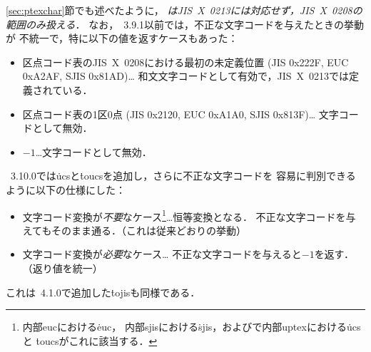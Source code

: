 \documentclass[a4paper,11pt,nomag,dvipdfmx]{jsarticle}
\begin{document}
\begin{dangerous}
  \ref{sec:ptexchar}節でも述べたように，
  \emph{\pTeX はJIS~X~0213には対応せず，JIS~X~0208の範囲のみ扱える}．
  なお，\pTeX~3.9.1以前では，不正な文字コードを与えたときの挙動が
  不統一で，特に以下の値を返すケースもあった：
  \begin{itemize}
    \item 区点コード表のJIS~X~0208における最初の未定義位置
          (JIS 0x222F, EUC 0xA2AF, SJIS 0x81AD)…
          和文文字コードとして有効で，JIS~X~0213では定義されている．
    \item 区点コード表の1区0点
          (JIS 0x2120, EUC 0xA1A0, SJIS 0x813F)…
          文字コードとして無効．
    \item $-1$…文字コードとして無効．
  \end{itemize}
  \pTeX~3.10.0では\.{ucs}と\.{toucs}を追加し，さらに不正な文字コードを
  容易に判別できるように以下の仕様にした：
  \begin{itemize}
    \item 文字コード変換が\emph{不要}なケース\footnote{内部eucにおける\.{euc}，
        内部sjisにおける\.{sjis}，および\upTeX で内部uptexにおける\.{ucs}と
        \.{toucs}がこれに該当する．}…恒等変換となる．
        不正な文字コードを与えてもそのまま通る．（これは従来どおりの挙動）
    \item 文字コード変換が\emph{必要}なケース…
        不正な文字コードを与えると$-1$を返す．（返り値を統一）
  \end{itemize}
  これは\pTeX~4.1.0で追加した\.{tojis}も同様である．
%
%
%
\end{dangerous}
\end{document}
